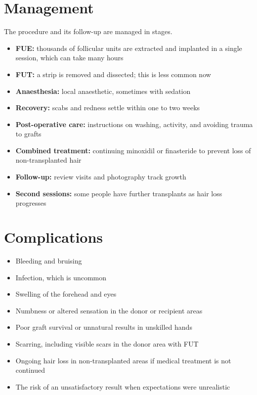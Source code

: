 \section*{Management}
The procedure and its follow-up are managed in stages.

\begin{itemize}
    \item \textbf{FUE:} thousands of follicular units are extracted and implanted in a single session, which can take many hours
    \item \textbf{FUT:} a strip is removed and dissected; this is less common now
    \item \textbf{Anaesthesia:} local anaesthetic, sometimes with sedation
    \item \textbf{Recovery:} scabs and redness settle within one to two weeks
    \item \textbf{Post-operative care:} instructions on washing, activity, and avoiding trauma to grafts
    \item \textbf{Combined treatment:} continuing minoxidil or finasteride to prevent loss of non-transplanted hair
    \item \textbf{Follow-up:} review visits and photography track growth
    \item \textbf{Second sessions:} some people have further transplants as hair loss progresses
\end{itemize}

\section*{Complications}
\begin{itemize}
    \item Bleeding and bruising
    \item Infection, which is uncommon
    \item Swelling of the forehead and eyes
    \item Numbness or altered sensation in the donor or recipient areas
    \item Poor graft survival or unnatural results in unskilled hands
    \item Scarring, including visible scars in the donor area with FUT
    \item Ongoing hair loss in non-transplanted areas if medical treatment is not continued
    \item The risk of an unsatisfactory result when expectations were unrealistic
\end{itemize}

